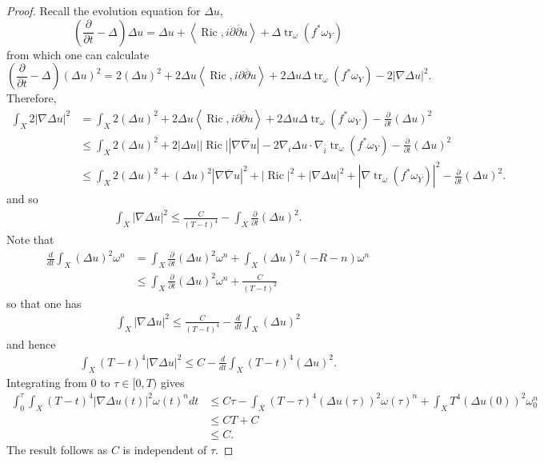 \documentclass[12pt]{article}
\numberwithin{equation}{section}
\renewcommand{\d}{\partial}
\newcommand{\dbar}{\overline{\partial}}
\DeclareMathOperator{\Ric}{Ric}
\DeclareMathOperator{\tr}{tr}
\newcommand{\oo}[1]{\overline{#1}}
\newcommand{\parabolic}[1]{\left(\frac{\d}{\d t} - \Delta_{#1}\right)}
\newcommand{\ip}[1]{\left\langle#1\right\rangle}
\begin{document}
\begin{proof}
Recall the evolution equation for $\Delta u$,
\begin{equation*}
    \parabolic{} \Delta u = \Delta u + \ip{\Ric, i\d\dbar u} + \Delta \tr_\omega (f^* \omega_Y)
\end{equation*}
from which one can calculate
\begin{equation*}
    \parabolic{} (\Delta u)^2 = 2 (\Delta u)^2 + 2 \Delta u \ip{\Ric, i\d\dbar u} + 2 \Delta u \Delta \tr_\omega( f^*\omega_Y) - 2 |\nabla \Delta u|^2.
\end{equation*}
Therefore,
\begin{align*}
    \int_X 2|\nabla \Delta u|^2 &= \int_X 2(\Delta u)^2 + 2\Delta u \ip{\Ric, i\d\dbar u} + 2\Delta u \Delta \tr_\omega (f^* \omega_Y) - \frac{\d}{\d t} (\Delta u)^2\\
    &\leq \int_X 2 (\Delta u)^2+2|\Delta u| |\Ric||\nabla \oo{\nabla} u| - 2\nabla_i \Delta u \cdot \nabla_{\oo{i}} \tr_\omega (f^* \omega_Y) - \frac{\d}{\d t} (\Delta u)^2 \\
    &\leq \int_X 2(\Delta u)^2+(\Delta u)^2|\nabla \oo{\nabla} u|^2 + |\Ric|^2 + |\nabla \Delta u|^2 + |\nabla \tr_\omega (f^*\omega_Y)|^2 - \frac{\d}{\d t} (\Delta u)^2.
\end{align*}
and so
\begin{align*}
    \int_X |\nabla \Delta u|^2 \leq \frac{C}{(T-t)^4} - \int_X \frac{\d}{\d t} (\Delta u)^2.
\end{align*}
Note that
\begin{align*}
    \frac{d}{dt} \int_X (\Delta u)^2 \omega^n &= \int_X \frac{\d}{\d t} (\Delta u)^2 \omega^n + \int_X (\Delta u)^2 (-R-n) \omega^n\\
    &\leq \int_X \frac{\d}{\d t} (\Delta u)^2 \omega^n + \frac{C}{(T-t)^2}
\end{align*}
so that one has
\begin{align*}
    \int_X |\nabla \Delta u|^2 \leq \frac{C}{(T-t)^4} - \frac{d}{dt} \int_X (\Delta u)^2
\end{align*}
and hence
\begin{align*}
    \int_X (T-t)^4 |\nabla \Delta u|^2 \leq C-\frac{d}{d t} \int_X (T-t)^4 (\Delta u)^2. 
\end{align*}
Integrating from $0$ to $\tau\in [0,T)$ gives
\begin{align*}
    \int_0^\tau \int_X (T-t)^4 |\nabla \Delta u(t)|^2 \omega(t)^n dt &\leq C\tau - \int_X (T-\tau)^4 (\Delta u(\tau))^2 \omega(\tau)^n + \int_X T^4 (\Delta u(0))^2 \omega_0^n \\
    &\leq CT + C\\
    &\leq C.
\end{align*}
The result follows as $C$ is independent of $\tau$.
\end{proof}
\end{document}
